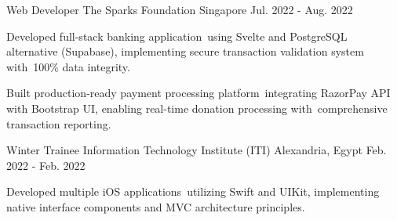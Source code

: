 \begin{cventries}
    
    \cventry
    {Web Developer} %
    {The Sparks Foundation} %
    {Singapore} %
    {Jul. 2022 - Aug. 2022} %
    {
      \begin{cvitems} %
        \item {Developed full-stack banking application using Svelte and PostgreSQL alternative (Supabase), implementing secure transaction validation system with 100\% data integrity.}
        \item {Built production-ready payment processing platform integrating RazorPay API with Bootstrap UI, enabling real-time donation processing with comprehensive transaction reporting.}
      \end{cvitems}
    }
    
   

    \cventry
    {Winter Trainee} %
    {Information Technology Institute (ITI)} %
    {Alexandria, Egypt} %
    {Feb. 2022 - Feb. 2022} %
    {
      \begin{cvitems} %
        \item {Developed multiple iOS applications utilizing Swift and UIKit, implementing native interface components and MVC architecture principles.}
      \end{cvitems}
    }
    
   
\end{cventries}
